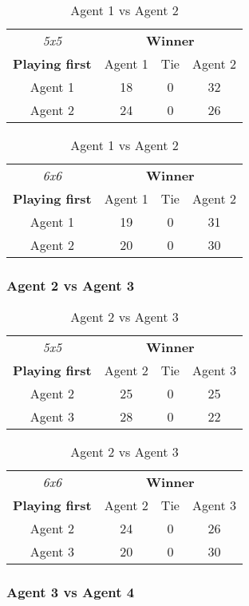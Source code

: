 \begin{table}[!h]
	\centering
	\label{result:Ag1vsAg2}
	\begin{tabular}{c | c | c | c}
		\textit{5x5} & \multicolumn{3}{c}{\textbf{Winner}}        \\
		\textbf{Playing first} & Agent 1 & Tie & Agent 2 \\ \hline
		Agent 1 & 18 & 0 & 32 \\ \hline
		Agent 2 & 24 & 0 & 26
	\end{tabular}
	\quad
	\begin{tabular}{c | c | c | c}
		\textit{6x6} & \multicolumn{3}{c}{\textbf{Winner}}        \\
		\textbf{Playing first} & Agent 1 & Tie & Agent 2 \\ \hline
		Agent 1 & 19 & 0 & 31 \\ \hline
		Agent 2 & 20 & 0 & 30
	\end{tabular}
	\caption{Agent 1 vs Agent 2}
\end{table}


\subsubsection{Agent 2 vs Agent 3}

\begin{table}[!h]
	\centering
	\label{result:Ag2vsAg3}
	\begin{tabular}{c | c | c | c}
		\textit{5x5} & \multicolumn{3}{c}{\textbf{Winner}}        \\
		\textbf{Playing first} & Agent 2 & Tie & Agent 3 \\ \hline
		Agent 2 & 25 & 0 & 25 \\ \hline
		Agent 3 & 28 & 0 & 22
	\end{tabular}
	\quad
	\begin{tabular}{c | c | c | c}
		\textit{6x6} & \multicolumn{3}{c}{\textbf{Winner}}        \\
		\textbf{Playing first} & Agent 2 & Tie & Agent 3 \\ \hline
		Agent 2 & 24 & 0 & 26 \\ \hline
		Agent 3 & 20 & 0 & 30
	\end{tabular}
	\caption{Agent 2 vs Agent 3}
\end{table}



\subsubsection{Agent 3 vs Agent 4}

